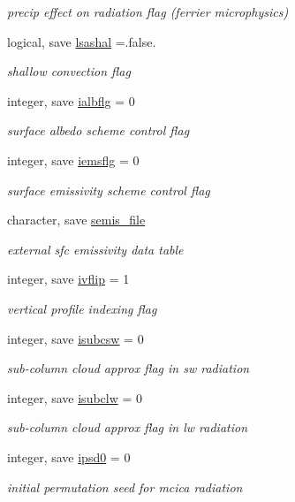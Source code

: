 \begin{DoxyCompactItemize}
\begin{DoxyCompactList}\small\item\em precip effect on radiation flag (ferrier microphysics) \end{DoxyCompactList}\item 
logical, save \hyperlink{namespacephysparam_abd79346fa2177075241fe6c5bc77004d}{lsashal} =.false.
\begin{DoxyCompactList}\small\item\em shallow convection flag \end{DoxyCompactList}\item 
integer, save \hyperlink{namespacephysparam_aeaf899d0cbd4248ad4b7f855cb4626e1}{ialbflg} = 0
\begin{DoxyCompactList}\small\item\em surface albedo scheme control flag \end{DoxyCompactList}\item 
integer, save \hyperlink{namespacephysparam_ac0ecfb79a533c6acab25971a3d871ea2}{iemsflg} = 0
\begin{DoxyCompactList}\small\item\em surface emissivity scheme control flag \end{DoxyCompactList}\item 
character, save \hyperlink{namespacephysparam_a3f616dfa9c7792a45732a16e8e0433c2}{semis\+\_\+file}
\begin{DoxyCompactList}\small\item\em external sfc emissivity data table \end{DoxyCompactList}\item 
integer, save \hyperlink{namespacephysparam_a7318a941744b1ec62dc9a6ff5bfbb50d}{ivflip} = 1
\begin{DoxyCompactList}\small\item\em vertical profile indexing flag \end{DoxyCompactList}\item 
integer, save \hyperlink{namespacephysparam_a2ec924900b312f94874ffb0f67d09dd9}{isubcsw} = 0
\begin{DoxyCompactList}\small\item\em sub-\/column cloud approx flag in sw radiation \end{DoxyCompactList}\item 
integer, save \hyperlink{namespacephysparam_a9555bc46102e3c368ca1f15c73b0692e}{isubclw} = 0
\begin{DoxyCompactList}\small\item\em sub-\/column cloud approx flag in lw radiation \end{DoxyCompactList}\item 
integer, save \hyperlink{namespacephysparam_adadc8b256d78414cf84290d1bec23fe6}{ipsd0} = 0
\begin{DoxyCompactList}\small\item\em initial permutation seed for mcica radiation \end{DoxyCompactList}\end{DoxyCompactItemize}


